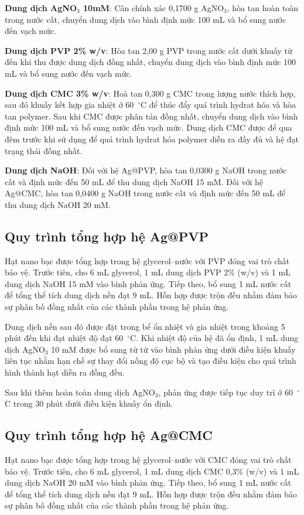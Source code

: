 \textbf{Dung dịch AgNO$_3$ 10mM}: Cân chính xác 0,1700 g AgNO$_3$, hòa tan hoàn toàn trong nước cất, chuyển dung dịch vào bình định mức 100 mL và bổ sung nước đến vạch mức. 

\textbf{Dung dịch PVP 2\% w/v}: Hòa tan 2,00 g PVP trong nước cất dưới khuấy từ đến khi thu được dung dịch đồng nhất, chuyển dung dịch vào bình định mức 100 mL và bổ sung nước đến vạch mức.

\textbf{Dung dịch CMC 3\% w/v}: Hoà tan 0,300 g CMC trong lượng nước thích hợp, sau đó khuấy kết hợp gia nhiệt ở 60~$^\circ$C để thúc đẩy quá trình hydrat hóa và hòa tan polymer. 
Sau khi CMC được phân tán đồng nhất, chuyển dung dịch vào bình định mức 100 mL và bổ sung nước đến vạch mức.
Dung dịch CMC được để qua đêm trước khi sử dụng để quá trình hydrat hóa polymer diễn ra đầy đủ và hệ đạt trạng thái đồng nhất.

\textbf{Dung dịch NaOH}: Đối với hệ Ag@PVP, hòa tan 0,0300 g NaOH trong nước cất và định mức đến 50 mL để thu dung dịch NaOH 15 mM.
Đối với hệ Ag@CMC, hòa tan 0,0400 g NaOH trong nước cất và định mức đến 50 mL để thu dung dịch NaOH 20 mM.


\subsection{Quy trình tổng hợp hệ Ag@PVP}
Hạt nano bạc được tổng hợp trong hệ glycerol–nước với PVP đóng vai trò chất bảo vệ. 
Trước tiên, cho 6 mL glycerol, 1 mL dung dịch PVP 2\% (w/v) và 1 mL dung dịch NaOH 15 mM vào bình phản ứng. 
Tiếp theo, bổ sung 1 mL nước cất để tổng thể tích dung dịch nền đạt 9 mL. 
Hỗn hợp được trộn đều nhằm đảm bảo sự phân bố đồng nhất của các thành phần trong hệ phản ứng.

Dung dịch nền sau đó được đặt trong bể ổn nhiệt và gia nhiệt trong khoảng 5 phút đến khi đạt nhiệt độ đạt 60~$^\circ$C. 
Khi nhiệt độ của hệ đã ổn định, 1 mL dung dịch AgNO$_3$ 10 mM được bổ sung từ từ vào bình phản ứng dưới điều kiện khuấy liên tục nhằm hạn chế sự thay đổi nồng độ cục bộ và tạo điều kiện cho quá trình hình thành hạt diễn ra đồng đều.

Sau khi thêm hoàn toàn dung dịch AgNO$_3$, phản ứng được tiếp tục duy trì ở 60~$^\circ$C trong 30 phút dưới điều kiện khuấy ổn định.

\subsection{Quy trình tổng hợp hệ Ag@CMC}
Hạt nano bạc được tổng hợp trong hệ glycerol–nước với CMC đóng vai trò chất bảo vệ. 
Trước tiên, cho 6 mL glycerol, 1 mL dung dịch CMC 0,3\% (w/v) và 1 mL dung dịch NaOH 20 mM vào bình phản ứng. 
Tiếp theo, bổ sung 1 mL nước cất để tổng thể tích dung dịch nền đạt 9 mL. 
Hỗn hợp được trộn đều nhằm đảm bảo sự phân bố đồng nhất của các thành phần trong hệ phản ứng.

